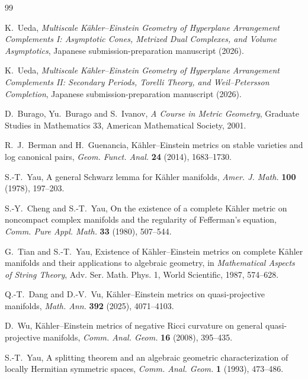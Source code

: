 \documentclass[11pt,a4paper]{ltjsarticle}
\theoremstyle{plain}
\theoremstyle{definition}
\theoremstyle{remark}
\begin{document}
\small
\begin{thebibliography}{99}
\footnotesize

K.~Ueda,
\newblock \emph{Multiscale K\"ahler--Einstein Geometry of Hyperplane Arrangement Complements I: Asymptotic Cones, Metrized Dual Complexes, and Volume Asymptotics},
\newblock Japanese submission-preparation manuscript (2026).

K.~Ueda,
\newblock \emph{Multiscale K\"ahler--Einstein Geometry of Hyperplane Arrangement Complements II: Secondary Periods, Torelli Theory, and Weil--Petersson Completion},
\newblock Japanese submission-preparation manuscript (2026).

D.~Burago, Yu.~Burago and S.~Ivanov,
\newblock \emph{A Course in Metric Geometry},
\newblock Graduate Studies in Mathematics 33, American Mathematical Society, 2001.

R.~J.~Berman and H.~Guenancia,
\newblock K\"ahler--Einstein metrics on stable varieties and log canonical pairs,
\newblock \emph{Geom. Funct. Anal.} \textbf{24} (2014), 1683--1730.

S.-T.~Yau,
\newblock A general Schwarz lemma for K\"ahler manifolds,
\newblock \emph{Amer. J. Math.} \textbf{100} (1978), 197--203.

S.-Y.~Cheng and S.-T.~Yau,
\newblock On the existence of a complete K\"ahler metric on noncompact complex manifolds and the regularity of Fefferman's equation,
\newblock \emph{Comm. Pure Appl. Math.} \textbf{33} (1980), 507--544.

G.~Tian and S.-T.~Yau,
\newblock Existence of K\"ahler--Einstein metrics on complete K\"ahler manifolds and their applications to algebraic geometry,
\newblock in \emph{Mathematical Aspects of String Theory}, Adv. Ser. Math. Phys. 1, World Scientific, 1987, 574--628.

Q.-T.~Dang and D.-V.~Vu,
\newblock K\"ahler--Einstein metrics on quasi-projective manifolds,
\newblock \emph{Math. Ann.} \textbf{392} (2025), 4071--4103.


D.~Wu,
\newblock K\"ahler--Einstein metrics of negative Ricci curvature on general quasi-projective manifolds,
\newblock \emph{Comm. Anal. Geom.} \textbf{16} (2008), 395--435.

S.-T.~Yau,
\newblock A splitting theorem and an algebraic geometric characterization of locally Hermitian symmetric spaces,
\newblock \emph{Comm. Anal. Geom.} \textbf{1} (1993), 473--486.


\end{thebibliography}
\end{document}
